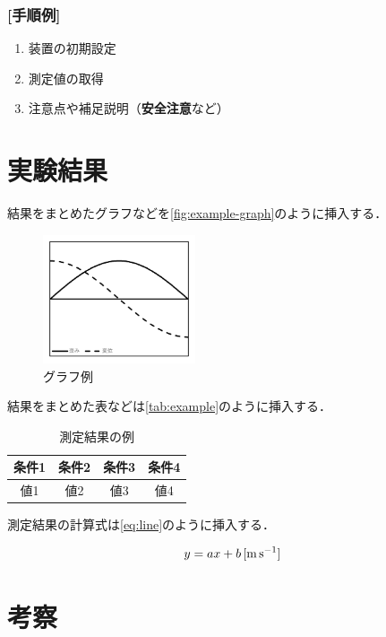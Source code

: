 \documentclass[lualatex,ja=standard]{bxjsarticle}
\begin{document}
\subsubsection*{[手順例]}

\begin{enumerate}
  \item 装置の初期設定
  \item 測定値の取得
  \item 注意点や補足説明（\textbf{安全注意}など）
\end{enumerate}

\section{実験結果}

結果をまとめたグラフなどを\autoref{fig:example-graph}のように挿入する．


\begin{figure}[htbp]
  \centering
  \includegraphics[width=0.4\textwidth]{img/BN/graph.png}
  \caption{グラフ例}
  \label{fig:example-graph}
\end{figure}

結果をまとめた表などは\autoref{tab:example}のように挿入する．

\begin{table}[htbp]
  \centering
  \caption{測定結果の例}
  \label{tab:example}
  \begin{tabular}{cccc}
    \toprule
    条件1 & 条件2 & 条件3 & 条件4 \\
    \midrule
    値1 & 値2 & 値3 & 値4 \\
    \bottomrule
  \end{tabular}
\end{table}

測定結果の計算式は\autoref{eq:line}のように挿入する．

\begin{equation}
  y = a x + b \,\text{[\si{\meter\per\second}]}
  \label{eq:line}
\end{equation}

\section{考察}
\end{document}
